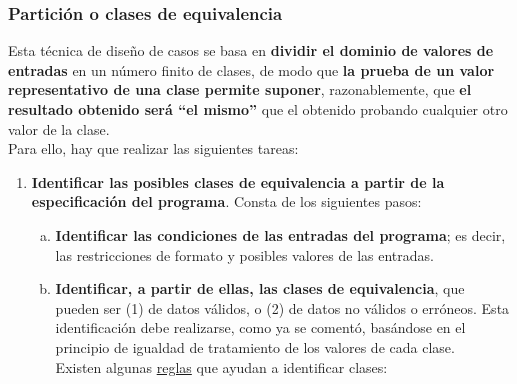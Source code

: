 \subsubsection{Partición o clases de equivalencia}

Esta técnica de diseño de casos se basa en \textbf{dividir el dominio de valores de entradas} en un número finito de clases, de modo que \textbf{la prueba de un valor representativo de una clase permite suponer}, razonablemente, que \textbf{el resultado obtenido será ``el mismo''} que el obtenido probando cualquier otro valor de la clase.\\

Para ello, hay que realizar las siguientes tareas:

\begin{enumerate}
    \item \textbf{Identificar las posibles clases de equivalencia a partir de la especificación del programa}. Consta de los siguientes pasos:
    
    \begin{enumerate}[a.]
        \item \textbf{Identificar las condiciones de las entradas del programa}; es decir, las restricciones de formato y posibles valores de las entradas.
        
        \item \textbf{Identificar, a partir de ellas, las clases de equivalencia}, que pueden ser (1) de datos válidos, o (2) de datos no válidos o erróneos. Esta identificación debe realizarse, como ya se comentó, basándose en el principio de igualdad de tratamiento de los valores de cada clase.\\
        
        Existen algunas \uline{reglas} que ayudan a identificar clases:


\end{enumerate}
\end{enumerate}
